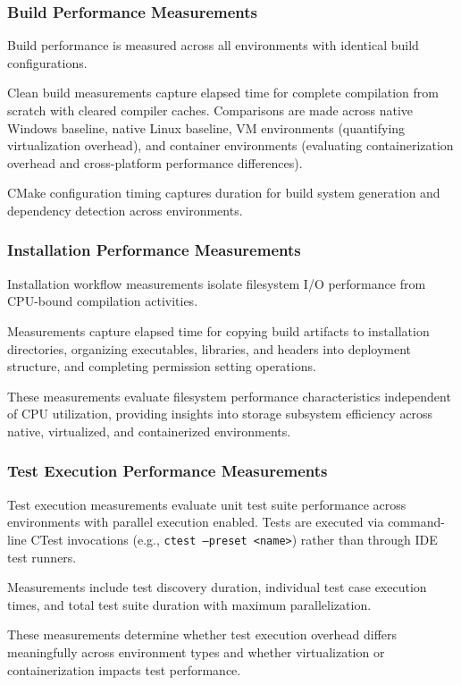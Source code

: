 \subsubsection{Build Performance Measurements}

Build performance is measured across all environments with identical build configurations.

Clean build measurements capture elapsed time for complete compilation from scratch with cleared compiler caches.
Comparisons are made across native Windows baseline, native Linux baseline, VM environments (quantifying virtualization overhead), and container environments (evaluating containerization overhead and cross-platform performance differences).

CMake configuration timing captures duration for build system generation and dependency detection across environments.

\subsubsection{Installation Performance Measurements}

Installation workflow measurements isolate filesystem I/O performance from CPU-bound compilation activities.

Measurements capture elapsed time for copying build artifacts to installation directories, organizing executables, libraries, and headers into deployment structure, and completing permission setting operations.

These measurements evaluate filesystem performance characteristics independent of CPU utilization, providing insights into storage subsystem efficiency across native, virtualized, and containerized environments.

\subsubsection{Test Execution Performance Measurements}

Test execution measurements evaluate unit test suite performance across environments with parallel execution enabled.
Tests are executed via command-line CTest invocations (e.g., \texttt{ctest --preset <name>}) rather than through IDE test runners.

Measurements include test discovery duration, individual test case execution times, and total test suite duration with maximum parallelization.

These measurements determine whether test execution overhead differs meaningfully across environment types and whether virtualization or containerization impacts test performance.

